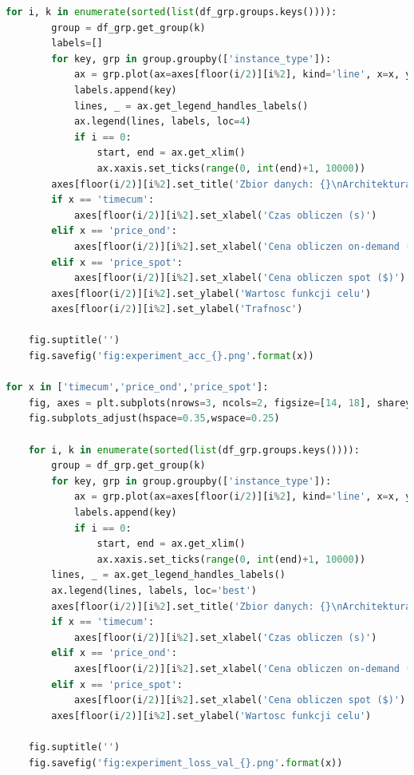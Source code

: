 \documentclass[12pt,a4paper,twoside]{article}
\begin{document}
\begin{appendices}
\begin{lstlisting}[language=python]
    for i, k in enumerate(sorted(list(df_grp.groups.keys()))):
        group = df_grp.get_group(k)
        labels=[]
        for key, grp in group.groupby(['instance_type']):
            ax = grp.plot(ax=axes[floor(i/2)][i%2], kind='line', x=x, y='acc', c='black', ls=lsd.get(key))
            labels.append(key)
            lines, _ = ax.get_legend_handles_labels()
            ax.legend(lines, labels, loc=4)
            if i == 0:
                start, end = ax.get_xlim()
                ax.xaxis.set_ticks(range(0, int(end)+1, 10000))
        axes[floor(i/2)][i%2].set_title('Zbior danych: {}\nArchitektura: {}'.format(k.split('_')[0], k.split('_')[1]))
        if x == 'timecum':
            axes[floor(i/2)][i%2].set_xlabel('Czas obliczen (s)')
        elif x == 'price_ond':
            axes[floor(i/2)][i%2].set_xlabel('Cena obliczen on-demand ($)')
        elif x == 'price_spot':
            axes[floor(i/2)][i%2].set_xlabel('Cena obliczen spot ($)')
        axes[floor(i/2)][i%2].set_ylabel('Wartosc funkcji celu')
        axes[floor(i/2)][i%2].set_ylabel('Trafnosc')

    fig.suptitle('')
    fig.savefig('fig:experiment_acc_{}.png'.format(x))

for x in ['timecum','price_ond','price_spot']:
    fig, axes = plt.subplots(nrows=3, ncols=2, figsize=[14, 18], sharey=False)
    fig.subplots_adjust(hspace=0.35,wspace=0.25)

    for i, k in enumerate(sorted(list(df_grp.groups.keys()))):
        group = df_grp.get_group(k)
        for key, grp in group.groupby(['instance_type']):
            ax = grp.plot(ax=axes[floor(i/2)][i%2], kind='line', x=x, y='val_loss', c='black', ls=lsd.get(key))
            labels.append(key)
            if i == 0:
                start, end = ax.get_xlim()
                ax.xaxis.set_ticks(range(0, int(end)+1, 10000))
        lines, _ = ax.get_legend_handles_labels()
        ax.legend(lines, labels, loc='best')
        axes[floor(i/2)][i%2].set_title('Zbior danych: {}\nArchitektura: {}'.format(k.split('_')[0], k.split('_')[1]))
        if x == 'timecum':
            axes[floor(i/2)][i%2].set_xlabel('Czas obliczen (s)')
        elif x == 'price_ond':
            axes[floor(i/2)][i%2].set_xlabel('Cena obliczen on-demand ($)')
        elif x == 'price_spot':
            axes[floor(i/2)][i%2].set_xlabel('Cena obliczen spot ($)')
        axes[floor(i/2)][i%2].set_ylabel('Wartosc funkcji celu')

    fig.suptitle('')
    fig.savefig('fig:experiment_loss_val_{}.png'.format(x))


\end{lstlisting}
\end{appendices}
\end{document}
